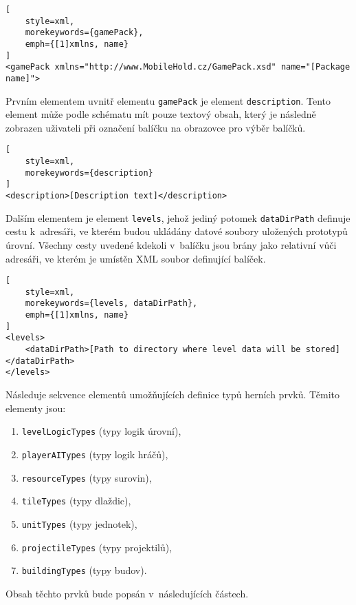 \begin{lstlisting}[
	style=xml,
	morekeywords={gamePack},
	emph={[1]xmlns, name}
]
<gamePack xmlns="http://www.MobileHold.cz/GamePack.xsd" name="[Package name]">
\end{lstlisting}

Prvním elementem uvnitř elementu \texttt{gamePack} je element \texttt{description}. Tento element může podle schématu mít pouze textový obsah, který je následně zobrazen uživateli při označení balíčku na obrazovce pro výběr balíčků.

\begin{lstlisting}[
	style=xml,
	morekeywords={description}
]
<description>[Description text]</description>
\end{lstlisting}

Dalším elementem je element \texttt{levels}, jehož jediný potomek \texttt{dataDirPath} definuje cestu k~adresáři, ve kterém budou ukládány datové soubory uložených prototypů úrovní. Všechny cesty uvedené kdekoli v~balíčku jsou brány jako relativní vůči adresáři, ve kterém je umístěn XML soubor definující balíček.

\begin{lstlisting}[
	style=xml,
	morekeywords={levels, dataDirPath},
	emph={[1]xmlns, name}
]
<levels>
	<dataDirPath>[Path to directory where level data will be stored]</dataDirPath>
</levels>
\end{lstlisting}

Následuje sekvence elementů umožňujících definice typů herních prvků. Těmito elementy jsou:

\begin{enumerate}
	\item \texttt{levelLogicTypes} (typy logik úrovní),
	\item \texttt{playerAITypes} (typy logik hráčů),
	\item \texttt{resourceTypes} (typy surovin),
	\item \texttt{tileTypes} (typy dlaždic),
	\item \texttt{unitTypes} (typy jednotek),
	\item \texttt{projectileTypes} (typy projektilů),
	\item \texttt{buildingTypes} (typy budov).
\end{enumerate}
Obsah těchto prvků bude popsán v~následujících částech. 

